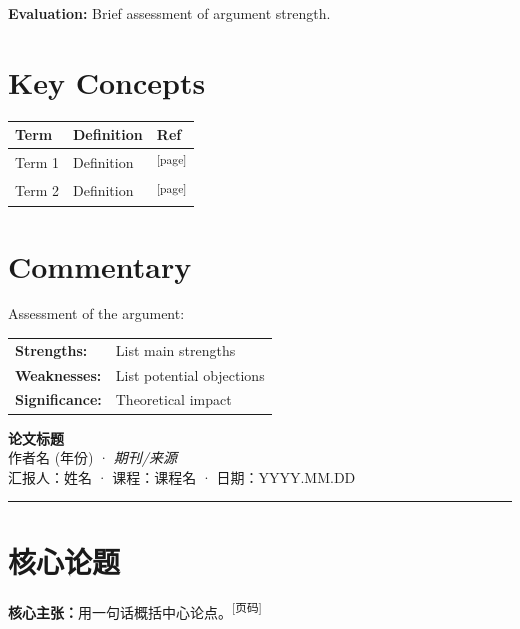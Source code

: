 \documentclass[10pt, a4paper]{article}
\newcommand{\pagemark}[1]{\textsuperscript{\scriptsize[#1]}}
\begin{document}
\textbf{Evaluation:} Brief assessment of argument strength.

\section*{Key Concepts}

\begin{center}
\begin{tabular}{@{}lll@{}}
\toprule
\textbf{Term} & \textbf{Definition} & \textbf{Ref} \\
\midrule
Term 1 & Definition & \pagemark{page} \\
Term 2 & Definition & \pagemark{page} \\
\bottomrule
\end{tabular}
\end{center}

\section*{Commentary}

Assessment of the argument:\\[0.3em]
\begin{tabular}{@{}p{3.5cm}p{10cm}@{}}
\textbf{Strengths:} & List main strengths \\[0.2em]
\textbf{Weaknesses:} & List potential objections \\[0.2em]
\textbf{Significance:} & Theoretical impact
\end{tabular}

\newpage


\begin{center}
  {\Large\bfseries\sffamily 论文标题}\\[3pt]
  {\normalsize 作者名 (年份) · \textit{期刊/来源}}\\[4pt]
  汇报人：姓名 · 课程：课程名 · 日期：YYYY.MM.DD
\end{center}

\vspace{0.3em}
\hrule
\vspace{0.5em}

\section*{核心论题}

\textbf{核心主张：}用一句话概括中心论点。\pagemark{页码}
\end{document}
